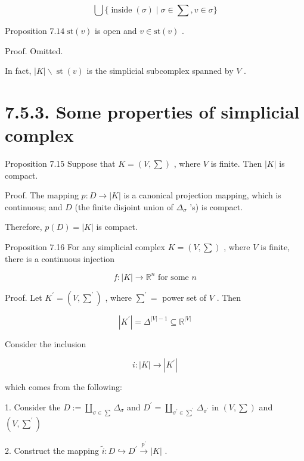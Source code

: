 \[
\bigcup \{ \operatorname{inside}\left( \sigma \right)  \mid  \sigma  \in  \sum ,v \in  \sigma \}
\]

Proposition \({7.14}\;\mathrm{{st}}\left( v\right)\) is open and \(v \in  \mathrm{{st}}\left( v\right)\) .

Proof. Omitted.

In fact, \(\left| K\right|  \smallsetminus  \operatorname{st}\left( v\right)\) is the simplicial subcomplex spanned by \(V\) .

\section*{7.5.3. Some properties of simplicial complex}

Proposition 7.15 Suppose that \(K = \left( {V,\sum }\right)\) , where \(V\) is finite. Then \(\left| K\right|\) is compact.

Proof. The mapping \(p : D \rightarrow  \left| K\right|\) is a canonical projection mapping, which is continuous; and \(D\) (the finite disjoint union of \({\Delta }_{\sigma }\) ’s) is compact.

Therefore, \(p\left( D\right)  = \left| K\right|\) is compact.

Proposition 7.16 For any simplicial complex \(K = \left( {V,\sum }\right)\) , where \(V\) is finite, there is a continuous injection

\[
f : \left| K\right|  \rightarrow  {\mathbb{R}}^{n}\text{ for some }n
\]

Proof. Let \({K}^{\prime } = \left( {V,{\sum }^{\prime }}\right)\) , where \({\sum }^{\prime } =\) power set of \(V\) . Then

\[
\left| {K}^{\prime }\right|  = {\Delta }^{\left| V\right|  - 1} \subseteq  {\mathbb{R}}^{\left| V\right| }
\]

Consider the inclusion

\[
i : \left| K\right|  \rightarrow  \left| {K}^{\prime }\right|
\]

which comes from the following:

1. Consider the \(D \mathrel{\text{ := }} \mathop{\coprod }\limits_{{\sigma  \in  \sum }}{\Delta }_{\sigma }\) and \({D}^{\prime } = \mathop{\coprod }\limits_{{{\sigma }^{\prime } \in  {\sum }^{\prime }}}{\Delta }_{{\sigma }^{\prime }}\) in \(\left( {V,\sum }\right)\) and \(\left( {V,{\sum }^{\prime }}\right)\)

2. Construct the mapping \(\widetilde{i} : D \hookrightarrow  {D}^{\prime }\overset{{p}^{\prime }}{ \rightarrow  }\left| K\right|\) .

